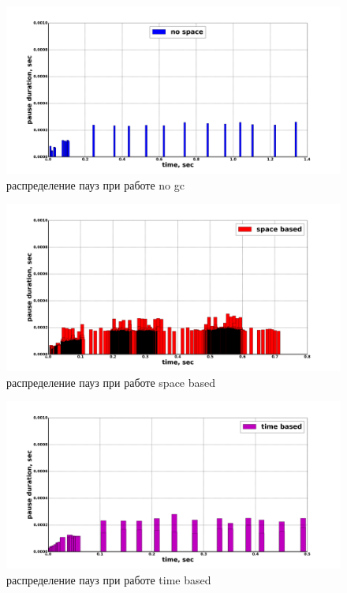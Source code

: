 \begin{figure}[ph]
\caption{\label{pic:pause-no-gc}распределение пауз при работе no gc}
\includegraphics[width=1\linewidth]{Bakradze/no-apce.png}
\end{figure}

\begin{figure}[ph]
\caption{\label{pic:space-based-pause}распределение пауз при работе space based}
\includegraphics[width=1\linewidth]{Bakradze/space-based-pause-same.png}
\end{figure}

\begin{figure}[ph]
\caption{\label{pic:time-based-pause}распределение пауз при работе time based}
\includegraphics[width=1\linewidth]{Bakradze/time_based.png}
\end{figure}

